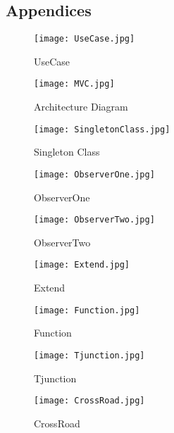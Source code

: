 \documentclass[12pt]{amsart}
\begin{document}
\subsection{Appendices}

\clearpage

\begin{figure}[htbp]
\texttt{[image: UseCase.jpg]}
\caption{UseCase}
\end{figure}

\clearpage

\begin{figure}[htbp]
\texttt{[image: MVC.jpg]}
\caption{Architecture Diagram}
\end{figure}

\clearpage

\begin{figure}[htbp]
\texttt{[image: SingletonClass.jpg]}
\caption{Singleton Class}
\end{figure}

\clearpage

\begin{figure}[htbp]
\texttt{[image: ObserverOne.jpg]}
\caption{ObserverOne}
\end{figure}

\clearpage

\begin{figure}[htbp]
\texttt{[image: ObserverTwo.jpg]}
\caption{ObserverTwo}
\end{figure}

\clearpage

\begin{figure}[htbp]
\texttt{[image: Extend.jpg]}
\caption{Extend}
\end{figure}

\clearpage

\begin{figure}[htbp]
\texttt{[image: Function.jpg]}
\caption{Function}
\end{figure}

\clearpage

\begin{figure}[htbp]
\texttt{[image: Tjunction.jpg]}
\caption{Tjunction}
\end{figure}

\clearpage

\begin{figure}[htbp]
\texttt{[image: CrossRoad.jpg]}
\caption{CrossRoad}
\end{figure}
\end{document}
